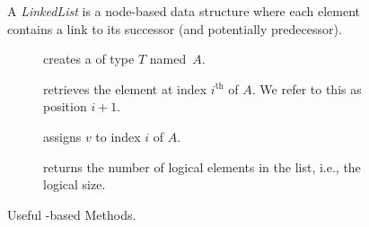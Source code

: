 \begin{figure}[tp]
  \small
  \begin{tcolorbox}[title=Java Linked Lists]
    A \textit{LinkedList} is a node-based data structure where each element contains a link to its successor (and potentially predecessor).
    \vspace{2ex}
  \begin{description}
    \item [] creates a  of type $T$ named~$A$.
    \item [] retrieves the element at index $i^{\text{th}}$ of $A$. We refer to this as position $i + 1$. 
    \item [] assigns $v$ to index $i$ of $A$.
    \item [] returns the number of logical elements in the list, i.e., the logical size.
  \end{description}
\end{tcolorbox}
  \caption{Useful -based Methods.}
  \label{fig:linkedlists}
\end{figure}


